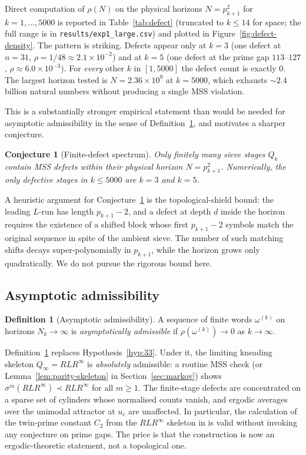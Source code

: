 \documentclass[11pt,a4paper]{article}
\newtheorem{conjecture}{Conjecture}
\theoremstyle{definition}
\newtheorem{definition}{Definition}
\begin{document}
Direct computation of $\rho(N)$ on the physical horizons
$N = p_{k+1}^2$ for $k = 1, \ldots, 5000$ is reported in
Table~\ref{tab:defect} (truncated to $k \leq 14$ for space; the full
range is in \texttt{results/exp1\_large.csv}) and plotted in
Figure~\ref{fig:defect-density}. The pattern is striking. Defects
appear only at $k = 3$ (one defect at $n = 31$,
$\rho = 1/48 \approx 2.1 \times 10^{-2}$) and at $k = 5$ (one defect at
the prime gap $113$--$127$, $\rho \approx 6.0 \times 10^{-3}$). For
\emph{every} other $k$ in $[1, 5000]$ the defect count is exactly $0$.
The largest horizon tested is $N = 2.36 \times 10^9$ at $k = 5000$,
which exhausts $\sim 2.4$ billion natural numbers without producing a
single MSS violation.

This is a substantially stronger empirical statement than would be
needed for asymptotic admissibility in the sense of
Definition~\ref{def:asymp-admiss}, and motivates a sharper conjecture.

\begin{conjecture}[Finite-defect spectrum]
\label{conj:finite-defects}
Only finitely many sieve stages $Q_k$ contain MSS defects within their
physical horizon $N = p_{k+1}^2$. Numerically, the only defective stages
in $k \leq 5000$ are $k = 3$ and $k = 5$.
\end{conjecture}

A heuristic argument for Conjecture~\ref{conj:finite-defects} is the
topological-shield bound: the leading $L$-run has length $p_{k+1} - 2$,
and a defect at depth $d$ inside the horizon requires the existence of
a shifted block whose first $p_{k+1} - 2$ symbols match the original
sequence in spite of the ambient sieve. The number of such matching
shifts decays super-polynomially in $p_{k+1}$, while the horizon grows
only quadratically. We do not pursue the rigorous bound here.

\subsection{Asymptotic admissibility}

\begin{definition}[Asymptotic admissibility]
\label{def:asymp-admiss}
A sequence of finite words $\omega^{(k)}$ on horizons $N_k \to \infty$
is \emph{asymptotically admissible} if $\rho(\omega^{(k)}) \to 0$ as
$k \to \infty$.
\end{definition}

Definition~\ref{def:asymp-admiss} replaces Hypothesis~\ref{hyp:33}.
Under it, the limiting kneading skeleton $Q_\infty = R L R^\infty$ is
\emph{absolutely} admissible: a routine MSS check (or
Lemma~\ref{lem:parity-skeleton} in Section~\ref{sec:markov}) shows
$\sigma^m(R L R^\infty) \prec R L R^\infty$ for all $m \geq 1$. The
finite-stage defects are concentrated on a sparse set of cylinders
whose normalised counts vanish, and ergodic averages over the unimodal
attractor at $u_c$ are unaffected. In particular, the calculation of
the twin-prime constant $C_2$ from the $RLR^\infty$ skeleton in
\cite{wang2026emergence} is valid without invoking any conjecture on
prime gaps. The price is that the construction is now an
ergodic-theoretic statement, not a topological one.
\end{document}
